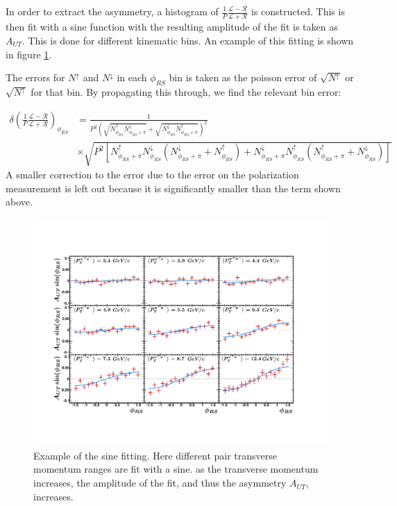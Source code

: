 \documentclass[abstract = on,listof=totoc, bibliography=totoc]{scrreprt}
\newcommand{\phirs}{\phi_{RS}}
\newcommand{\ptpair}{P_{T}^{\pi^+\pi^-}}
\newcommand{\pip}{\pi^+}
\newcommand{\pim}{\pi^-}
\newcommand{\pair}{$\pip\pim$ }
\newcommand{\nup}{N^\uparrow}
\newcommand{\ndw}{N^\downarrow}
\begin{document}
In order to extract the asymmetry, a histogram of $\frac{1}{P}\frac{\mathcal{L} - \mathcal{R}}{\mathcal{L} + \mathcal{R}}$ is constructed. This is then fit with a sine function with the resulting amplitude of the fit is taken as $A_{UT}$. This is done for different kinematic bins. An example of this fitting is shown in figure \ref{fig:sinFit}. 

The errors for $N^\uparrow$ and $N^\downarrow$ in each $\phirs$ bin is taken as the poisson error of $\sqrt{N^\uparrow}$ or $\sqrt{N^\uparrow}$ for that bin. By propagating this through, we find the relevant bin error:

\begin{align}
\delta\left(\frac{1}{P}\frac{\mathcal{L} - \mathcal{R}}{\mathcal{L} + \mathcal{R}}\right)_{\phirs} & = \frac{1}{P^2 \left(\sqrt{\nup_{\phirs} \ndw_{\phirs+\pi}} + \sqrt{\ndw_{\phirs}\nup_{\phirs + \pi}}\right)^2} \nonumber \\
& \times \sqrt{P^2\left[   \nup_{\phirs+\pi} \ndw_{\phirs} \left( \ndw_{\phirs+\pi} + \nup_{\phirs}\right) +  \ndw_{\phirs+\pi} \nup_{\phirs} \left( \nup_{\phirs+\pi} + \ndw_{\phirs}\right) \right]}
\label{eq:binError}
\end{align}
%
A smaller correction to the error due to the error on the polarization measurement is left out because it is significantly smaller than the term shown above.



\begin{figure}
\begin{center}
\includegraphics[width = 1\textwidth]{sinFit3}
\caption[Sinusoid modulation of \pair pair produciton and fit for 9 $\ptpair$ bins]{Example of the sine fitting. Here different pair transverse momentum ranges are fit with a sine. as the transverse momentum increases, the amplitude of the fit, and thus the asymmetry $A_{UT}$, increases.}
\label{fig:sinFit}
\end{center}
\end{figure}
\end{document}
